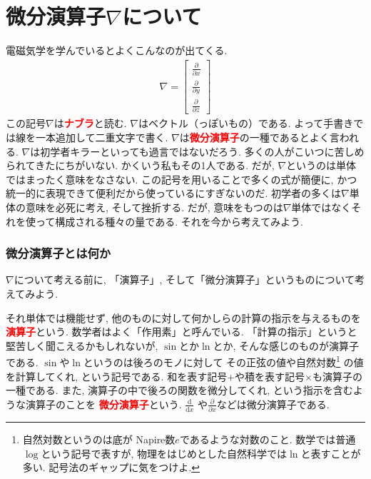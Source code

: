 \section{微分演算子$\nabla$について}
電磁気学を学んでいるとよくこんなのが出てくる. 
\begin{eqnarray}
\nabla = \left[
 \begin{array}{c}
\displaystyle
\frac{\partial}{\partial x} \\
\displaystyle
\frac{\partial}{\partial y} \\
\displaystyle
\frac{\partial}{\partial z} 
 \end{array}
\right]
\label{eq:nabla}
\end{eqnarray}
この記号$\nabla$は\textbf{\textcolor{red}{ナブラ}}と読む. 
$\nabla$はベクトル（っぽいもの）である. よって手書きでは線を一本追加して二重文字で書く. 
$\nabla$は\textbf{\textcolor{red}{微分演算子}}の一種であるとよく言われる. 
$\nabla$は初学者キラーといっても過言ではないだろう. 多くの人がこいつに苦しめられてきたにちがいない. 
かくいう私もその1人である. だが, $\nabla$というのは単体ではまったく意味をなさない. 
この記号を用いることで多くの式が簡便に, かつ統一的に表現できて便利だから使っているにすぎないのだ. 
初学者の多くは$\nabla$単体の意味を必死に考え, そして挫折する. 
だが, 意味をもつのは$\nabla$単体ではなくそれを使って構成される種々の量である. 
それを今から考えてみよう. 
\subsubsection{微分演算子とは何か}
$\nabla$について考える前に, 「演算子」, そして「微分演算子」というものについて考えてみよう. 

それ単体では機能せず, 他のものに対して何かしらの計算の指示を与えるものを
\textbf{\textcolor{red}{演算子}}という. 数学者はよく「作用素」と呼んでいる. 
「計算の指示」というと堅苦しく聞こえるかもしれないが, $\sin$とか$\ln$とか, 
そんな感じのものが演算子である. 
$\sin$や$\ln$というのは後ろのモノに対して
その正弦の値や自然対数\footnote{自然対数というのは底が
Napire数$e$であるような対数のこと. 数学では普通$\log$という記号で表すが, 
物理をはじめとした自然科学では$\ln$と表すことが多い. 記号法のギャップに気をつけよ.} の値を計算してくれ, という記号である. 
和を表す記号$+$や積を表す記号$\times$も演算子の一種である. 
また, 演算子の中で後ろの関数を微分してくれ, という指示を含むような演算子のことを
\textbf{\textcolor{red}{微分演算子}}という. $\displaystyle \frac{\mathrm{d}}{\mathrm{d}x}$
や$\displaystyle \frac{\partial}{\partial x}$などは微分演算子である. 

